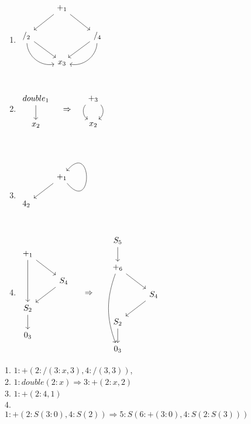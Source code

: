 \documentclass{book}
\theoremstyle{definition}
\begin{document}
\begin{figure}
\begin{enumerate}
    \item $
          \begin{tikzcd}
              & +_1 \ar[ld] \ar[rd] & \\
              /_2 \ar[rd, bend right=50] \ar[rd] & & /_4 \ar[ld] \ar[ld, bend left=50]\\
              & x_3 & \\
          \end{tikzcd}
          $
    \item $
          \begin{tikzcd}
              double_1 \ar[d] \\
              x_2
          \end{tikzcd} \ \ \ \Rightarrow \ \ \ 
          \begin{tikzcd}
              +_3 \ar[d, bend right=50] \ar[d, bend left=50] \\
              x_2        
          \end{tikzcd}
          $
    \item $
          \begin{tikzcd}
              & +_1 \ar[ld] \ar[loop, out = -50, in = 50, distance = 5em] \\
            4_2 & \\
          \end{tikzcd}
          $
    \item $
          \begin{tikzcd}
              +_1 \ar[rd] \ar[dd] &             \\
                                  & S_4 \ar[ld] \\
              S_2 \ar[d]          &             \\
              0_3                 &
          \end{tikzcd}
          \ \ \ \ \Rightarrow\ \ \ \ 
          \begin{tikzcd}
              S_5 \ar[d]                          &             \\
              +_6 \ar[ddd, bend right=20] \ar[rd] &             \\
                                                  & S_4 \ar[ld] \\
              S_2 \ar[d]                          &             \\
              0_3                                 &
          \end{tikzcd}
          $
\end{enumerate}
\caption{1. $1:+(2:/(3:x,3), 4:/(3,3))$,\\
         2. $1:double(2:x) \Rightarrow 3:+(2:x, 2)$\\
         3. $1:+(2:4, 1)$\\
         4. $1:+(2:S(3:0), 4:S(2)) \Rightarrow 5:S(6:+(3:0), 4:S(2:S(3)))$}
\label{fig:termGraph}
\end{figure}
\end{document}
